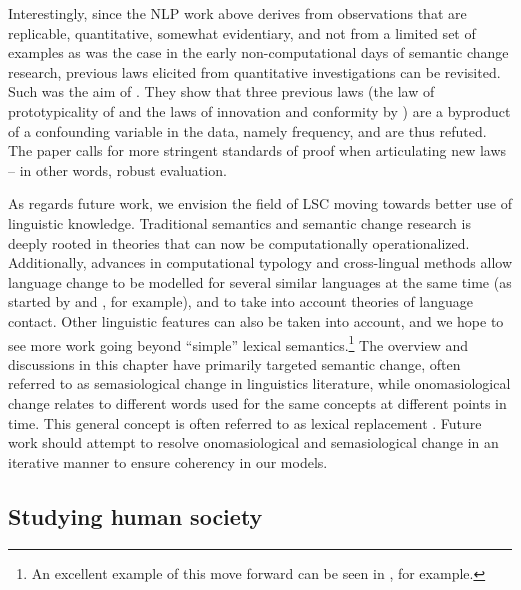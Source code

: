 \documentclass[output=paper]{langscibook}
\begin{document}
Interestingly, since the NLP work above derives from observations that are replicable, quantitative, somewhat evidentiary, and not from a limited set of examples as was the case in the early non-computational days of semantic change research, previous laws elicited from quantitative investigations can be revisited. 
Such was the aim of \citet{dubossarsky-etal-2017-outta}. They show that three previous laws (the law of prototypicality of \citealt{dubossarsky2015bottom}  and the laws of innovation and conformity by \citealt{hamilton-etal-2016-diachronic}) are a byproduct of a confounding variable in the data, namely frequency, and are thus refuted. The paper calls for more stringent standards of proof when articulating new laws -- in other words, robust evaluation.

As regards future work, we envision the field of LSC moving towards better use of linguistic knowledge.
Traditional semantics and semantic change research is deeply rooted in theories that can now be computationally operationalized. 
Additionally, advances in computational typology and cross-lingual methods allow  language change to be modelled for several similar languages at the same time (as started by \citealt{uban-etal-2019-studying} and \citealt{frossard-etal-2020-dataset}, for example), and to take into account theories of language contact.
Other linguistic features can also be taken into account, and we hope to see more work going beyond ``simple'' lexical semantics.\footnote{An excellent example of this move forward can be seen in \citet{fonteyn2020grammar}, for example.}
The overview and discussions in this chapter have primarily targeted semantic change, often referred to as semasiological change in linguistics literature, while onomasiological change relates to different words used for the same concepts at different points in time. This general concept is often referred to as lexical replacement \citep{tahmasebi2018survey}. Future work should attempt to resolve onomasiological and semasiological change in an iterative manner to ensure coherency in our models. 

\subsection{Studying human society}
\end{document}
